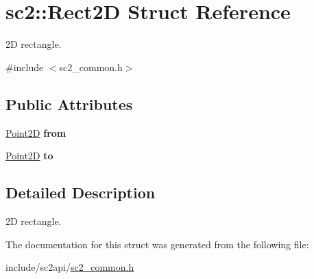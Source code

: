 \hypertarget{structsc2_1_1_rect2_d}{}\section{sc2\+:\+:Rect2D Struct Reference}
\label{structsc2_1_1_rect2_d}


2D rectangle.  




{\ttfamily \#include $<$sc2\+\_\+common.\+h$>$}

\subsection*{Public Attributes}
\begin{DoxyCompactItemize}
\item 
\mbox{\label{structsc2_1_1_rect2_d_aa2c03f4709717b7d58eb2440749d6dc9}} 
\hyperlink{structsc2_1_1_point2_d}{Point2D} {\bfseries from}
\item 
\mbox{\label{structsc2_1_1_rect2_d_a2739b79ff04ed2c539375330294fcaf8}} 
\hyperlink{structsc2_1_1_point2_d}{Point2D} {\bfseries to}
\end{DoxyCompactItemize}


\subsection{Detailed Description}
2D rectangle. 

The documentation for this struct was generated from the following file\+:\begin{DoxyCompactItemize}
\item 
include/sc2api/\hyperlink{sc2__common_8h}{sc2\+\_\+common.\+h}\end{DoxyCompactItemize}

